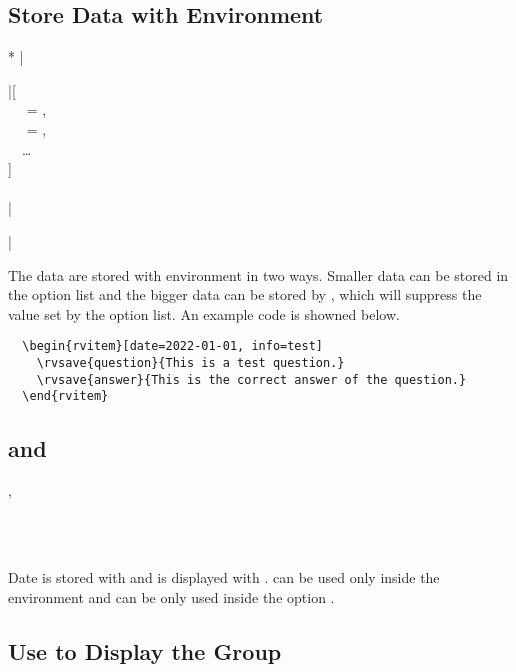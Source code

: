 \documentclass[full]{l3doc}
\begin{document}
\begin{documentation}
\subsection{Store Data with  Environment}

\noindent{}
\begin{Syntax}*
  |\begin{rvitem}|[ \\
  ~~ = , \\
  ~~ = , \\
  ~~\ldots{} \\
  ] \\
  ~~ \\
  |\end{rvitem}|
\end{Syntax}

The data are stored with  environment in two ways. Smaller data
can be stored in the option list and the bigger data can be stored by
, which will suppress the value set by the option list. An example
code is showned below.

\begin{verbatim}
  \begin{rvitem}[date=2022-01-01, info=test]
    \rvsave{question}{This is a test question.}
    \rvsave{answer}{This is the correct answer of the question.}
  \end{rvitem}
\end{verbatim}

\subsection{ and }

\begin{function}{\rvsave, \rvuse}
  \begin{syntax}
       \\
       \\
  \end{syntax}

  Date is stored with  and is displayed with .  
  can be used only inside the  environment and  can be
  only used inside the option .
\end{function}

\subsection{Use  to Display the Group}


\end{documentation}
\end{document}
